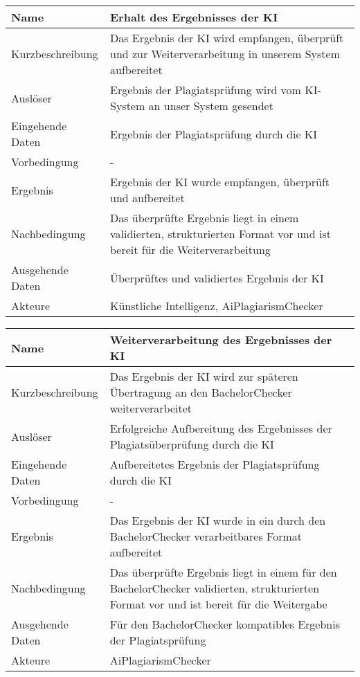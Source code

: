 \begin{tabularx}{\textwidth}{|l|X|}
    \hline
    \textbf{Name} & \textbf{Erhalt des Ergebnisses der KI} \\
    \hline
    Kurzbeschreibung & Das Ergebnis der KI wird empfangen, überprüft und zur Weiterverarbeitung in unserem System aufbereitet \\
    \hline
    Auslöser & Ergebnis der Plagiatsprüfung wird vom KI-System an unser System gesendet \\
    \hline
    Eingehende Daten & Ergebnis der Plagiatsprüfung durch die KI \\
    \hline
    Vorbedingung & - \\
    \hline
    Ergebnis & Ergebnis der KI wurde empfangen, überprüft und aufbereitet \\
    \hline
    Nachbedingung & Das überprüfte Ergebnis liegt in einem validierten, strukturierten Format vor und ist bereit für die Weiterverarbeitung \\
    \hline
    Ausgehende Daten & Überprüftes und validiertes Ergebnis der KI \\
    \hline
    Akteure & Künstliche Intelligenz, AiPlagiarismChecker \\
    \hline
\end{tabularx}


\begin{tabularx}{\textwidth}{|l|X|}
    \hline
    \textbf{Name} & \textbf{Weiterverarbeitung des Ergebnisses der KI} \\
    \hline
    Kurzbeschreibung & Das Ergebnis der KI wird zur späteren Übertragung an den BachelorChecker weiterverarbeitet \\
    \hline
    Auslöser & Erfolgreiche Aufbereitung des Ergebnisses der Plagiatsüberprüfung durch die KI \\
    \hline
    Eingehende Daten & Aufbereitetes Ergebnis der Plagiatsprüfung durch die KI \\
    \hline
    Vorbedingung & - \\
    \hline
    Ergebnis & Das Ergebnis der KI wurde in ein durch den BachelorChecker verarbeitbares Format aufbereitet \\
    \hline
    Nachbedingung & Das überprüfte Ergebnis liegt in einem für den BachelorChecker validierten, strukturierten Format vor und ist bereit für die Weitergabe \\
    \hline
    Ausgehende Daten & Für den BachelorChecker kompatibles Ergebnis der Plagiatsprüfung \\
    \hline
    Akteure & AiPlagiarismChecker \\
    \hline
\end{tabularx}


